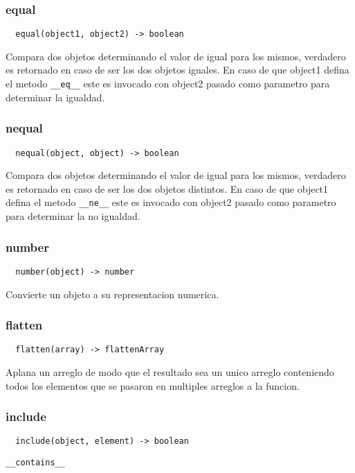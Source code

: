 \subsubsection*{equal}
\begin{verbatim}
  equal(object1, object2) -> boolean
\end{verbatim}
Compara dos objetos determinando el valor de igual para los mismos, verdadero es
retornado en caso de ser los dos objetos iguales.
En caso de que object1 defina el metodo \verb|__eq__| este es invocado con object2
pasado como parametro para determinar la igualdad.

\subsubsection*{nequal}
\begin{verbatim}
  nequal(object, object) -> boolean
\end{verbatim}
Compara dos objetos determinando el valor de igual para los mismos, verdadero es
retornado en caso de ser los dos objetos distintos.
En caso de que object1 defina el metodo \verb|__ne__| este es invocado con object2
pasado como parametro para determinar la no igualdad.

\subsubsection*{number}
\begin{verbatim}
  number(object) -> number
\end{verbatim}
Convierte un objeto a su representacion numerica.

\subsubsection*{flatten}
\begin{verbatim}
  flatten(array) -> flattenArray
\end{verbatim}
Aplana un arreglo de modo que el resultado sea un unico arreglo conteniendo todos los elementos que se pasaron en multiples arreglos a la funcion.

\subsubsection*{include}
\begin{verbatim}
  include(object, element) -> boolean
\end{verbatim}
\verb|__contains__|

